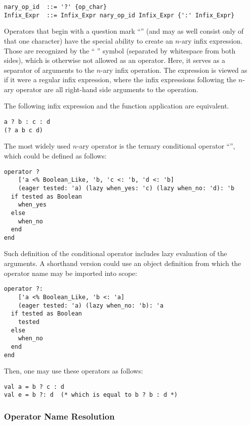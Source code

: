 \grammar\begin{lstlisting}
nary_op_id  ::= '?' {op_char}
Infix_Expr  ::= Infix_Expr nary_op_id Infix_Expr {':' Infix_Expr}
\end{lstlisting}

Operators that begin with a question mark ``'' (and may as well consist only of that one character) have the special ability to create an $n$-ary infix expression. Those are recognized by the ``\,\code{:}\,'' symbol (separated by whitespace from both sides), which is otherwise not allowed as an operator. Here, it serves as a separator of arguments to the $n$-ary infix operation. The expression is viewed as if it were a regular infix expression, where the infix expressions following the $n$-ary operator are all right-hand side arguments to the operation. 

The following infix expression and the function application are equivalent.
\begin{lstlisting}
a ? b : c : d
(? a b c d)
\end{lstlisting}

\example The most widely used $n$-ary operator is the ternary conditional operator ``'', which could be defined as follows:

\begin{lstlisting}
operator ? 
    ['a <% Boolean_Like, 'b, 'c <: 'b, 'd <: 'b]
    (eager tested: 'a) (lazy when_yes: 'c) (lazy when_no: 'd): 'b
  if tested as Boolean
    when_yes
  else
    when_no
  end
end
\end{lstlisting}

Such definition of the conditional operator includes lazy evaluation of the arguments. A shorthand version could use an object definition from which the operator name may be imported into scope:

\begin{lstlisting}
operator ?: 
    ['a <% Boolean_Like, 'b <: 'a]
    (eager tested: 'a) (lazy when_no: 'b): 'a
  if tested as Boolean
    tested
  else
    when_no
  end
end
\end{lstlisting}

Then, one may use these operators as follows: 

\begin{lstlisting}
val a = b ? c : d
val e = b ?: d  (* which is equal to b ? b : d *)
\end{lstlisting}





\subsubsection{Operator Name Resolution}

